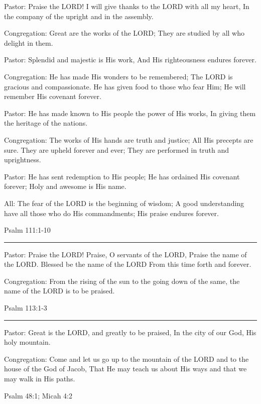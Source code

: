 \documentclass[]{book}
\begin{document}
Pastor: Praise the LORD! I will give thanks to the LORD with all my heart, In the company of the upright and in the assembly.

Congregation: Great are the works of the LORD; They are studied by all who delight in them.

Pastor: Splendid and majestic is His work, And His righteousness endures forever.

Congregation: He has made His wonders to be remembered; The LORD is gracious and compassionate. He has given food to those who fear Him; He will remember His covenant forever.

Pastor: He has made known to His people the power of His works, In giving them the heritage of the nations.

Congregation: The works of His hands are truth and justice; All His precepts are sure. They are upheld forever and ever; They are performed in truth and uprightness.

Pastor: He has sent redemption to His people; He has ordained His covenant forever; Holy and awesome is His name.

All: The fear of the LORD is the beginning of wisdom; A good understanding have all those who do His commandments; His praise endures forever.

Psalm 111:1-10 \textbar{}

\begin{center}\rule{0.5\linewidth}{\linethickness}\end{center}

Pastor: Praise the LORD! Praise, O servants of the LORD, Praise the name of the LORD. Blessed be the name of the LORD From this time forth and forever.

Congregation: From the rising of the sun to the going down of the same, the name of the LORD is to be praised.

Psalm 113:1-3 \textbar{}

\begin{center}\rule{0.5\linewidth}{\linethickness}\end{center}

Pastor: Great is the LORD, and greatly to be praised, In the city of our God, His holy mountain.

Congregation: Come and let us go up to the mountain of the LORD and to the house of the God of Jacob, That He may teach us about His ways and that we may walk in His paths.

Psalm 48:1; Micah 4:2 \textbar{}
\end{document}
